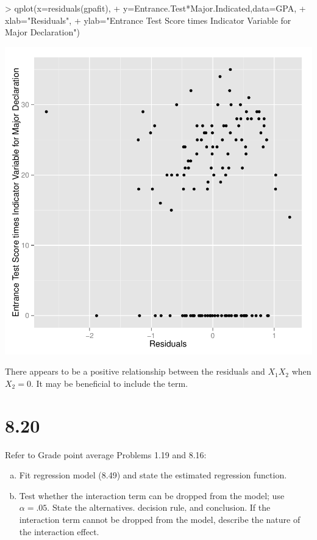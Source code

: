 \documentclass{article}
\begin{document}
\begin{enumerate}[a)]
\begin{Schunk}
\begin{Sinput}
> qplot(x=residuals(gpafit),
+       y=Entrance.Test*Major.Indicated,data=GPA,
+       xlab="Residuals",
+       ylab="Entrance Test Score times Indicator Variable for Major Declaration")
\end{Sinput}
\end{Schunk}
\includegraphics{Fig-moreresplots}

There appears to be a positive relationship between the residuals and $X_1X_2$ when $X_2 = 0$. It may be beneficial to include the term.
\end{enumerate}

\section{8.20}

Refer to Grade point average Problems 1.19 and 8.16:

\begin{enumerate}[a)]
\item{} Fit regression model (8.49) and state the estimated regression function.
\item{} Test whether the interaction term can be dropped from the model; use $\alpha{} = .05$. State the alternatives. decision rule, and conclusion. If the interaction term cannot be dropped from the model, describe the nature of the interaction effect.
\end{enumerate}
\end{document}
